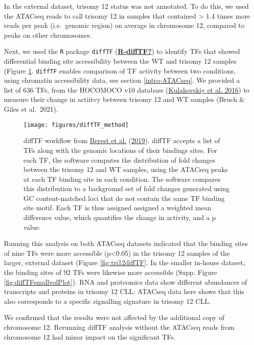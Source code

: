 \documentclass[11pt, a4paper, twosided]{book}
\begin{document}
In the external dataset, trisomy 12 status was not annotated. To do this, we used the ATACseq reads to call trisomy 12 in samples that contained \textgreater{} 1.4 times more reads per peak (i.e.~genomic region) on average in chromosome 12, compared to peaks on other chromosomes.

Next, we used the \texttt{R} package \texttt{diffTF} (\protect\hyperlink{ref-R-diffTF}{\textbf{R-diffTF?}}) to identify TFs that showed differential binding site accessibility between the WT and trisomy 12 samples (Figure \ref{fig:diffTFexplainer}. \texttt{diffTF} enables comparison of TF activity between two conditions, using chromatin accessibility data, see section \ref{intro-ATACseq}. We provided a list of 636 TFs, from the HOCOMOCO v10 database (\protect\hyperlink{ref-HOCOMOCO}{Kulakovskiy et al. 2016}) to measure their change in actiitvy between trisomy 12 and WT samples (Bruch \& Giles et al.~2021).


\begin{figure}

{\centering \texttt{[image: figures/diffTF\_method]} 

}

\caption{diffTF workflow from \protect\hyperlink{ref-Berest2019}{Berest et al.} (\protect\hyperlink{ref-Berest2019}{2019}). diffTF accepts a list of TFs along with the genomic locations of their bindings sites. For each TF, the software computes the distribution of fold changes between the trisomy 12 and WT samples, using the ATACseq peaks at each TF binding site in each condition. The software compares this distribution to a background set of fold changes generated using GC content-matched loci that do not contain the same TF binding site motif. Each TF is thus assigned assigned a weighted mean difference value, which quantifies the change in activity, and a p value.}\label{fig:diffTFexplainer}
\end{figure}
Running this analysis on both ATACseq datasets indicated that the binding sites of nine TFs were more accessible (p\textless0.05) in the trisomy 12 samples of the larger, external dataset (Figure \ref{fig:tri12diffTF}. In the smaller in-house dataset, the binding sites of 92 TFs were likewise more accessible (Supp. Figure \ref{fig:diffTFsmallvolPlot}). RNA and proteomics data show different abundances of transcripts and proteins in trisomy 12 CLL: ATACseq data here shows that this also corresponds to a specific signalling signature in trisomy 12 CLL.

We confirmed that the results were not affected by the additional copy of chromosome 12. Rerunning diffTF analysis without the ATACseq reads from chromosome 12 had minor impact on the significant TFs.
\end{document}

